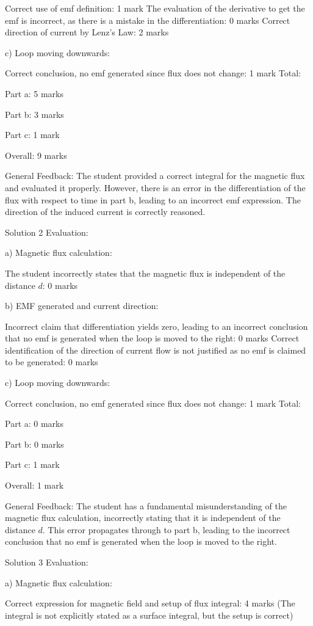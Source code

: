 \documentclass[a4paper,11pt]{article}
\begin{document}
Correct use of emf definition: 1 mark
The evaluation of the derivative to get the emf is incorrect, as there is a mistake in the differentiation: 0 marks
Correct direction of current by Lenz's Law: 2 marks

c) Loop moving downwards:

Correct conclusion, no emf generated since flux does not change: 1 mark
Total:

Part a: 5 marks

Part b: 3 marks

Part c: 1 mark

Overall: 9 marks

General Feedback:
The student provided a correct integral for the magnetic flux and evaluated it properly. However, there is an error in the differentiation of the flux with respect to time in part b, leading to an incorrect emf expression. The direction of the induced current is correctly reasoned.

Solution 2 Evaluation:

a) Magnetic flux calculation:

The student incorrectly states that the magnetic flux is independent of the distance \(d\): 0 marks

b) EMF generated and current direction:

Incorrect claim that differentiation yields zero, leading to an incorrect conclusion that no emf is generated when the loop is moved to the right: 0 marks
Correct identification of the direction of current flow is not justified as no emf is claimed to be generated: 0 marks

c) Loop moving downwards:

Correct conclusion, no emf generated since flux does not change: 1 mark
Total:

Part a: 0 marks

Part b: 0 marks

Part c: 1 mark

Overall: 1 mark

General Feedback:
The student has a fundamental misunderstanding of the magnetic flux calculation, incorrectly stating that it is independent of the distance \(d\). This error propagates through to part b, leading to the incorrect conclusion that no emf is generated when the loop is moved to the right.

Solution 3 Evaluation:

a) Magnetic flux calculation:

Correct expression for magnetic field and setup of flux integral: 4 marks (The integral is not explicitly stated as a surface integral, but the setup is correct)
\end{document}
